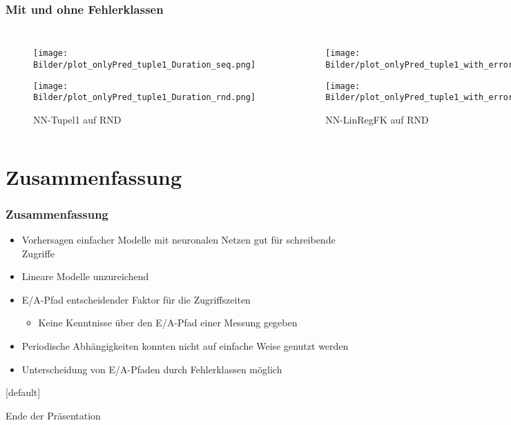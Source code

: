 \documentclass{beamer}
\makeatletter
\newenvironment{withoutheadline}{
	\setbeamertemplate{headline}[default]
	\def\beamer@entrycode{\vspace*{-\headheight}}
}{}
\makeatother
\begin{document}
\begin{frame}
\frametitle{Mit und ohne Fehlerklassen}
\begin{columns}
	\begin{figure}
		\texttt{[image: Bilder/plot\_onlyPred\_tuple1\_Duration\_seq.png]}\\
		\vspace*{-0.45cm}
		\caption{NN-Tupel1 auf SEQ}
		\texttt{[image: Bilder/plot\_onlyPred\_tuple1\_Duration\_rnd.png]}
		\vspace*{-0.45cm}
		\caption{NN-Tupel1 auf RND}
	\end{figure}
		\begin{figure}
		\texttt{[image: Bilder/plot\_onlyPred\_tuple1\_with\_error\_class\_from\_linreg\_Duration\_seq.png]}\\
		\vspace*{-0.45cm}
		\caption{NN-LinRegFK auf SEQ}
		\texttt{[image: Bilder/plot\_onlyPred\_tuple1\_with\_error\_class\_from\_linreg\_Duration\_rnd.png]}
		\vspace*{-0.45cm}
		\caption{NN-LinRegFK auf RND}
	\end{figure}
\end{columns}
\end{frame}

\section{Zusammenfassung}
\begin{frame}
\frametitle{Zusammenfassung}
\begin{itemize}
	\item Vorhersagen einfacher Modelle mit neuronalen Netzen gut für schreibende Zugriffe 
	\item Lineare Modelle unzureichend
	\item E/A-Pfad entscheidender Faktor für die Zugriffszeiten
	\begin{itemize}
		\item Keine Kenntnisse über den E/A-Pfad einer Messung gegeben
	\end{itemize}
	\item Periodische Abhängigkeiten konnten nicht auf einfache Weise genutzt werden
	\item Unterscheidung von E/A-Pfaden durch Fehlerklassen möglich
\end{itemize}	
\end{frame}
\begin{withoutheadline}
	\begin{frame}[plain]
		\Huge{\centerline{Ende der Präsentation}}
	\end{frame}
\end{withoutheadline}
\end{document}
